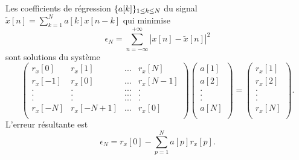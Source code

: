 \begin{theorem} 
Les coefficients de r\'egression $\{a[k]\}_{ 1 \leq k \leq N}$ du
signal $\tilde x [n] =  \sum_{k=1}^N a[k] x[n-k]$ qui
minimise
\[
\epsilon_N = \sum_{n=-\infty}^{+\infty} |x[n] - \tilde x[n]|^2
\]
sont solutions du syst\`eme
\begin{equation}
\label{yule-walker2}
\left( \begin{array}{cccc}
r_x[0] &r_x[1] & ...&r_x[N] \\
r_x[-1]&r_x[0]& ...&r_x[N-1]\\
. &. &...&.  \\
.&.&...&.\\
.&.&...&.\\
r_x[-N]&r_x[-N+1]&...&r_x[0]\\
\end{array}
\right)
\left( \begin{array}{c}
a[1]\\
a[2]\\
.\\
.\\
.\\
a[N]\\
\end{array}
\right)
=
\left( \begin{array}{c}
r_x[1]\\
r_x[2]\\
.\\
.\\
.\\
r_x[N]\\
\end{array}
\right) .
\end{equation}
L'erreur r\'esultante est
\begin{equation}
\label{erro-regre}
\epsilon_N = r_x [0] - \sum_{p=1}^N a[p] r_x[p] .
\end{equation}
\end{theorem}

